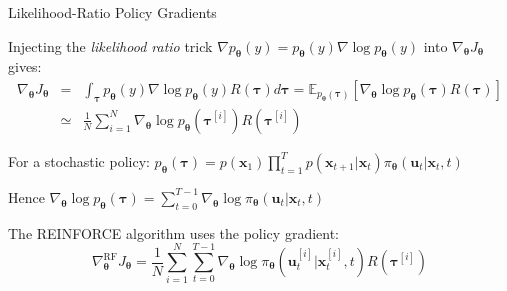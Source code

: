 \documentclass[10pt]{beamer}
\begin{document}
\begin{frame}{Likelihood-Ratio Policy Gradients}

Injecting the \textit{{ likelihood ratio}} trick $\nabla p_{\bm{\theta}}(y) = p_{\bm{\theta}}(y) \nabla \log p_{\bm{\theta}}(y)$ into $\nabla_{\bm{\theta}} J_{\bm{\theta}} $ gives:
\begin{eqnarray*}
\nabla_{\bm{\theta}} J_{\bm{\theta}} &=& 
\int_{\bm{\tau}} p_{\bm{\theta}}(y) \nabla \log p_{\bm{\theta}}(y) R({\bm{\tau}}) d{\bm{\tau}} = 
\mathbb{E}_{p_{\bm{\theta}}({\bm{\tau}})}[ \nabla_{\bm{\theta}} \log p_{\bm{\theta}}({\bm{\tau}})  R({\bm{\tau}})] \\ &\simeq&  \frac{1}{N} \sum_{i=1}^N \nabla_{\bm{\theta}} \log p_{\bm{\theta}}({\bm{\tau}}^{[i]})  R({\bm{\tau}}^{[i]})
\end{eqnarray*}

For a stochastic policy: $ p_{\bm{\theta}}({\bm{\tau}}) = p({\bm{x}}_1) \prod_{t=1}^T p({\bm{x}}_{t+1} | {\bm{x}}_t) \pi_{\bm{\theta}}({\bm{u}}_t | {\bm{x}}_t, t)$

Hence $ \nabla_{\bm{\theta}} \log p_{\bm{\theta}}({\bm{\tau}}) = \sum_{t=0}^{T-1} \nabla_{\bm{\theta}} \log \pi_{\bm{\theta}}({\bm{u}}_t | {\bm{x}}_t, t) $

The { REINFORCE} algorithm uses the policy gradient:
$$\nabla^{\textrm{RF}}_{\bm{\theta}} J_{\bm{\theta}} 
= \frac{1}{N} \sum_{i=1}^N \sum_{t=0}^{T-1} \nabla_{\bm{\theta}} \log \pi_{\bm{\theta}}({\bm{u}}_t^{[i]} | {\bm{x}}_t^{[i]}, t)   R({\bm{\tau}}^{[i]})$$


\end{frame}
\end{document}

